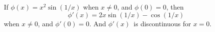  If $\phi(x) = x^{2}\sin(1/x)$ when $x \neq 0$, and $\phi(0) = 0$, then
\[
\phi'(x) = 2x\sin(1/x) - \cos(1/x)
\]
when $x\neq 0$, and $\phi'(0) = 0$. And $\phi'(x)$~is discontinuous for $x = 0$.

